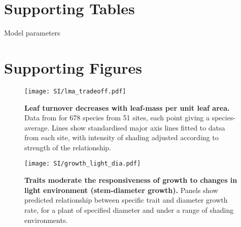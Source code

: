 \documentclass[10pt,twoside]{article}\usepackage[]{graphicx}\usepackage[]{color}
\date{}
\begin{document}
\maketitle

\tableofcontents

\renewcommand{\thefigure}{S\arabic{figure}}
\renewcommand{\thetable}{S\arabic{table}}
\setcounter{secnumdepth}{0}

\clearpage

\section{Supporting Tables}\label{app:supp_info_table}



\begin{table}[ht]
\caption{Model parameters}
\centering
{\footnotesize  %
\begin{doublespace}
% 

\end{doublespace}
}
\label{tab:params}
\end{table}

\newpage

\section{Supporting Figures}\label{app:supp_info_figures}


\begin{figure}[ht]
\centering
\texttt{[image: SI/lma\_tradeoff.pdf]}
\caption{\textbf{Leaf turnover decreases with leaf-mass per unit leaf area.}
Data from \citep{Wright-2004} for 678 species from 51 sites, each
point giving a species-average. Lines show standardised major axis lines
fitted to datsa from each site, with intensity of shading adjusted
according to strength of the relationship.\label{fS-leaf}}
\end{figure}

\newpage


\begin{figure}[ht]
\centering
\texttt{[image: SI/growth\_light\_dia.pdf]}
\caption{\textbf{Traits moderate the responsiveness of growth to changes
in light environment (stem-diameter growth).} Panels show predicted relationship between specific trait and diameter growth rate, for a plant of specified
diameter and under a range of shading environments.
\label{fig:growth_light_dia}}
\end{figure}
\end{document}
